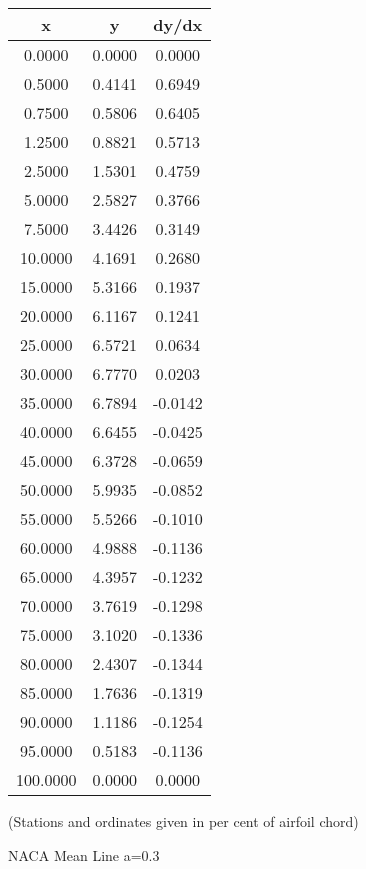 \documentclass[11pt]{book}
\begin{document}
 \vspace{8mm}
 \begin{tabular}{|c|c|c|}  \hline
 x & y & dy/dx \\
 \hline
0.0000 & 0.0000 & 0.0000 \\
0.5000 & 0.4141 & 0.6949 \\
0.7500 & 0.5806 & 0.6405 \\
1.2500 & 0.8821 & 0.5713 \\
2.5000 & 1.5301 & 0.4759 \\
5.0000 & 2.5827 & 0.3766 \\
7.5000 & 3.4426 & 0.3149 \\
10.0000 & 4.1691 & 0.2680 \\
15.0000 & 5.3166 & 0.1937 \\
20.0000 & 6.1167 & 0.1241 \\
25.0000 & 6.5721 & 0.0634 \\
30.0000 & 6.7770 & 0.0203 \\
35.0000 & 6.7894 & -0.0142 \\
40.0000 & 6.6455 & -0.0425 \\
45.0000 & 6.3728 & -0.0659 \\
50.0000 & 5.9935 & -0.0852 \\
55.0000 & 5.5266 & -0.1010 \\
60.0000 & 4.9888 & -0.1136 \\
65.0000 & 4.3957 & -0.1232 \\
70.0000 & 3.7619 & -0.1298 \\
75.0000 & 3.1020 & -0.1336 \\
80.0000 & 2.4307 & -0.1344 \\
85.0000 & 1.7636 & -0.1319 \\
90.0000 & 1.1186 & -0.1254 \\
95.0000 & 0.5183 & -0.1136 \\
100.0000 & 0.0000 & 0.0000 \\
 \hline
 \end{tabular}
 \vspace{8mm}

(Stations and ordinates given in per cent of airfoil chord)

 \newpage
 \label{mla=0.3}
 \begin{Large}
 NACA Mean Line a=0.3
 \end{Large}
  
\end{document}

